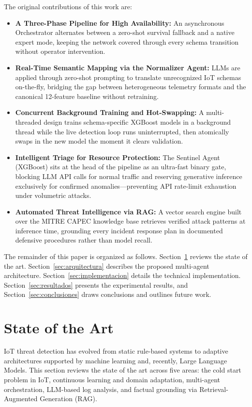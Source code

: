 \documentclass[conference]{IEEEtran}
\begin{document}
The original contributions of this work are:
\begin{itemize}
    \item \textbf{A Three-Phase Pipeline for High Availability:} An asynchronous Orchestrator alternates between a zero-shot survival fallback and a native expert mode, keeping the network covered through every schema transition without operator intervention.
    \item \textbf{Real-Time Semantic Mapping via the Normalizer Agent:} LLMs are applied through zero-shot prompting to translate unrecognized IoT schemas on-the-fly, bridging the gap between heterogeneous telemetry formats and the canonical 12-feature baseline without retraining.
    \item \textbf{Concurrent Background Training and Hot-Swapping:} A multi-threaded design trains schema-specific XGBoost models in a background thread while the live detection loop runs uninterrupted, then atomically swaps in the new model the moment it clears validation.
    \item \textbf{Intelligent Triage for Resource Protection:} The Sentinel Agent (XGBoost) sits at the head of the pipeline as an ultra-fast binary gate, blocking LLM API calls for normal traffic and reserving generative inference exclusively for confirmed anomalies---preventing API rate-limit exhaustion under volumetric attacks.
    \item \textbf{Automated Threat Intelligence via RAG:} A vector search engine built over the MITRE CAPEC knowledge base retrieves verified attack patterns at inference time, grounding every incident response plan in documented defensive procedures rather than model recall.
\end{itemize}

The remainder of this paper is organized as follows. Section~\ref{sec:related} reviews the state of the art. Section~\ref{sec:arquitectura} describes the proposed multi-agent architecture. Section~\ref{sec:implementacion} details the technical implementation. Section~\ref{sec:resultados} presents the experimental results, and Section~\ref{sec:conclusiones} draws conclusions and outlines future work.



\section{State of the Art}
\label{sec:related}
IoT threat detection has evolved from static rule-based systems to adaptive architectures supported by machine learning and, recently, Large Language Models. This section reviews the state of the art across five areas: the cold start problem in IoT, continuous learning and domain adaptation, multi-agent orchestration, LLM-based log analysis, and factual grounding via Retrieval-Augmented Generation (RAG).
\end{document}

